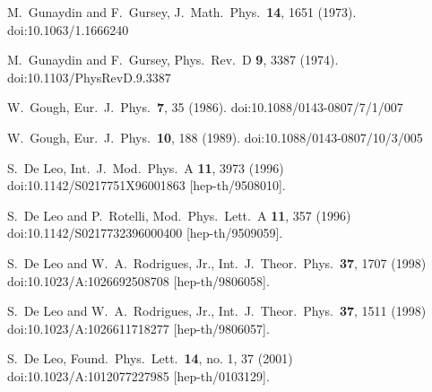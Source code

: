 \documentclass[epsfig,12pt]{article}
\begin{document}
\begin{thebibliography}{99}
  M.~Gunaydin and F.~Gursey,
  J.\ Math.\ Phys.\  {\bf 14}, 1651 (1973).
  doi:10.1063/1.1666240

  M.~Gunaydin and F.~Gursey,
  Phys.\ Rev.\ D {\bf 9}, 3387 (1974).
  doi:10.1103/PhysRevD.9.3387

  W.~Gough,
  Eur.\ J.\ Phys.\ {\bf 7}, 35 (1986).
  doi:10.1088/0143-0807/7/1/007

  W.~Gough,
  Eur.\ J.\ Phys.\ {\bf 10}, 188 (1989).
  doi:10.1088/0143-0807/10/3/005

  S.~De Leo,
  Int.\ J.\ Mod.\ Phys.\ A {\bf 11}, 3973 (1996)
  doi:10.1142/S0217751X96001863
  [hep-th/9508010].

  S.~De Leo and P.~Rotelli,
  Mod.\ Phys.\ Lett.\ A {\bf 11}, 357 (1996)
  doi:10.1142/S0217732396000400
  [hep-th/9509059].

  S.~De Leo and W.~A.~Rodrigues, Jr.,
  Int.\ J.\ Theor.\ Phys.\  {\bf 37}, 1707 (1998)
  doi:10.1023/A:1026692508708
  [hep-th/9806058].

  S.~De Leo and W.~A.~Rodrigues, Jr.,
  Int.\ J.\ Theor.\ Phys.\  {\bf 37}, 1511 (1998)
  doi:10.1023/A:1026611718277
  [hep-th/9806057].

  S.~De Leo,
  Found.\ Phys.\ Lett.\  {\bf 14}, no. 1, 37 (2001)
  doi:10.1023/A:1012077227985
  [hep-th/0103129].


\end{thebibliography}
\end{document}

